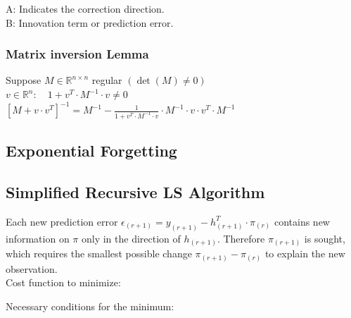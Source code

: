 \documentclass[10pt,a4paper]{scrartcl}
\begin{document}
\begin{multicols*}{3}
\begin{enumerate}
A: Indicates the correction direction. \\
B: Innovation term or prediction error.
\end{enumerate}

\subsubsection{Matrix inversion Lemma}

Suppose $M\in\mathbb{R}^{n\times n}$ regular $(\det(M)\neq 0)$ \\
$v\in\mathbb{R}^n:\quad 1+v^T\cdot M^{-1}\cdot v \neq 0$ \\
$[M+v\cdot v^T]^{-1}=M^{-1}-\frac{1}{1+v^T\cdot M^{-1}\cdot v}\cdot M^{-1}\cdot v\cdot v^T\cdot M^{-1}$

\subsection{Exponential Forgetting}


\small
{}\normalsize

\subsection{Simplified Recursive LS Algorithm}
Each new prediction error $\epsilon_{(r+1)} = y_{(r+1)} - h^T_{(r+1)} \cdot \pi_{(r)}$ contains new information on $\pi$ only in the direction of $h_{(r+1)}$. Therefore $\pi_{(r+1)}$ is sought, which requires the smallest possible change $\pi_{(r+1)}-\pi_{(r)}$ to explain the new observation.\\
Cost function to minimize:


Necessary conditions for the minimum:



\end{multicols*}
\end{document}
